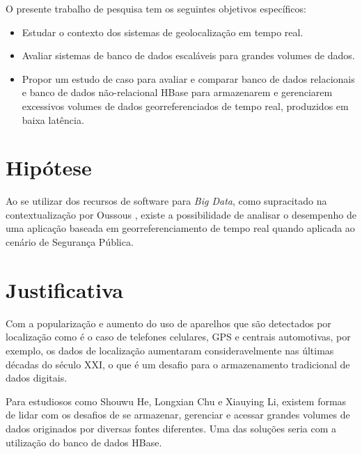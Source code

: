 O presente trabalho de pesquisa tem os seguintes objetivos específicos:

\begin{itemize}
	\item Estudar o contexto dos sistemas de geolocalização em tempo real.
	\item Avaliar sistemas de banco de dados escaláveis para grandes volumes de dados.
	\item Propor um estudo de caso para avaliar e comparar banco de dados relacionais e banco de dados não-relacional HBase para armazenarem e gerenciarem excessivos volumes de dados georreferenciados de tempo real, produzidos em baixa latência.
	 
\end{itemize}

\section {Hipótese}

Ao se utilizar dos recursos de software para \textit{Big Data}, como supracitado na contextualização por Oussous \cite{OUSSOUS-Big-Data}, existe a possibilidade de analisar o desempenho de uma aplicação baseada em georreferenciamento de tempo real quando aplicada ao cenário de Segurança Pública.


\section {Justificativa}

Com a popularização e aumento do uso de aparelhos que são detectados por localização como é o caso de telefones celulares, GPS e centrais automotivas, por exemplo, os dados de localização aumentaram consideravelmente nas últimas décadas do século XXI, o que é um desafio para o armazenamento tradicional de dados digitais\cite{Chu-Li-justifica}. 

Para estudiosos como Shouwu He, Longxian Chu e Xiauying Li, existem formas de lidar com os desafios de se armazenar, gerenciar e acessar grandes volumes de dados originados por diversas fontes diferentes. Uma das soluções seria com a utilização do banco de dados HBase\cite{Chu-Li-justifica}.

